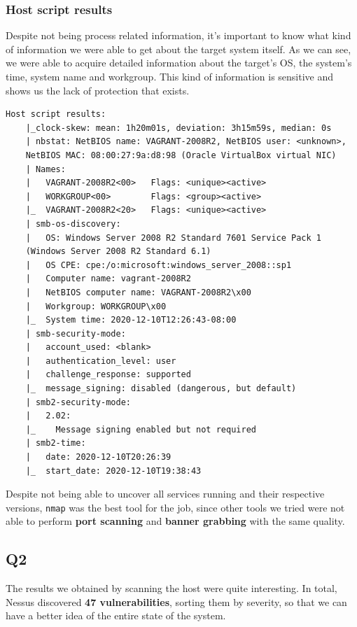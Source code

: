 \subsubsection{Host script results}

Despite not being process related information, it's important to know what kind of information we were able to get about the target system itself. As we can see, we were able to acquire detailed information about the target's OS, the system's time, system name and workgroup. This kind of information is sensitive and shows us the lack of protection that exists.

\pagebreak

\begin{lstlisting}[basicstyle=\scriptsize]
    Host script results:
    |_clock-skew: mean: 1h20m01s, deviation: 3h15m59s, median: 0s
    | nbstat: NetBIOS name: VAGRANT-2008R2, NetBIOS user: <unknown>, 
    NetBIOS MAC: 08:00:27:9a:d8:98 (Oracle VirtualBox virtual NIC)
    | Names:
    |   VAGRANT-2008R2<00>   Flags: <unique><active>
    |   WORKGROUP<00>        Flags: <group><active>
    |_  VAGRANT-2008R2<20>   Flags: <unique><active>
    | smb-os-discovery: 
    |   OS: Windows Server 2008 R2 Standard 7601 Service Pack 1
    (Windows Server 2008 R2 Standard 6.1)
    |   OS CPE: cpe:/o:microsoft:windows_server_2008::sp1
    |   Computer name: vagrant-2008R2
    |   NetBIOS computer name: VAGRANT-2008R2\x00
    |   Workgroup: WORKGROUP\x00
    |_  System time: 2020-12-10T12:26:43-08:00
    | smb-security-mode: 
    |   account_used: <blank>
    |   authentication_level: user
    |   challenge_response: supported
    |_  message_signing: disabled (dangerous, but default)
    | smb2-security-mode: 
    |   2.02: 
    |_    Message signing enabled but not required
    | smb2-time: 
    |   date: 2020-12-10T20:26:39
    |_  start_date: 2020-12-10T19:38:43
\end{lstlisting}

Despite not being able to uncover all services running and their respective versions, \texttt{nmap} was the best tool for the job, since other tools we tried were not able to perform \textbf{port scanning} and \textbf{banner grabbing} with the same quality.

\subsection{Q2}

The results we obtained by scanning the host were quite interesting. In total, Nessus discovered \textbf{47 vulnerabilities}, sorting them by severity, so that we can have a better idea of the entire state of the system.

